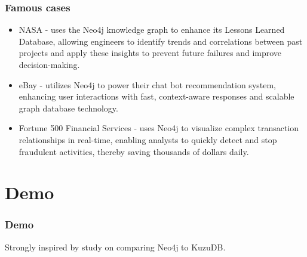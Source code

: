 \documentclass[aspectratio=169]{beamer}
\begin{document}
\begin{frame}
    \frametitle{Famous cases}
	\begin{itemize}
		\item NASA - uses the Neo4j knowledge graph to enhance its Lessons Learned Database, allowing engineers to identify trends and correlations between past projects and apply these insights to prevent future failures and improve decision-making.
		\item eBay - utilizes Neo4j to power their chat bot recommendation system, enhancing user interactions with fast, context-aware responses and scalable graph database technology.
		\item Fortune 500 Financial Services - uses Neo4j to visualize complex transaction relationships in real-time, enabling analysts to quickly detect and stop fraudulent activities, thereby saving thousands of dollars daily.
	\end{itemize}
\end{frame}

\section{Demo}

\begin{frame}
    \frametitle{Demo}
    Strongly inspired by study on comparing Neo4j to KuzuDB. 
\end{frame}
\end{document}
